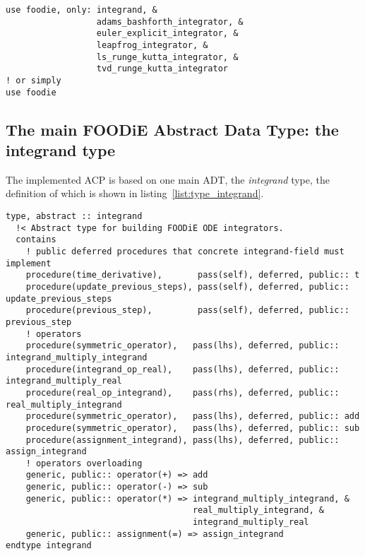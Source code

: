 \documentclass[pdftex,preprint,3p,times,numbers]{elsarticle}
\begin{document}
\begin{lstlisting}[firstnumber=1,style=code,caption={usage example importing all public entities of FOODiE main module},label={list:main_module}]
use foodie, only: integrand, &
                  adams_bashforth_integrator, &
                  euler_explicit_integrator, &
                  leapfrog_integrator, &
                  ls_runge_kutta_integrator, &
                  tvd_runge_kutta_integrator
! or simply
use foodie
\end{lstlisting}

\subsection{The main FOODiE Abstract Data Type: the integrand type}\label{subsec:type_integrand}

The implemented ACP is based on one main ADT, the \emph{integrand} type, the definition of which is shown in listing~\ref{list:type_integrand}.

\begin{lstlisting}[firstnumber=1,style=code,caption={integrand type definition},label={list:type_integrand}]
type, abstract :: integrand
  !< Abstract type for building FOODiE ODE integrators.
  contains
    ! public deferred procedures that concrete integrand-field must implement
    procedure(time_derivative),       pass(self), deferred, public:: t
    procedure(update_previous_steps), pass(self), deferred, public:: update_previous_steps
    procedure(previous_step),         pass(self), deferred, public:: previous_step
    ! operators
    procedure(symmetric_operator),   pass(lhs), deferred, public:: integrand_multiply_integrand
    procedure(integrand_op_real),    pass(lhs), deferred, public:: integrand_multiply_real
    procedure(real_op_integrand),    pass(rhs), deferred, public:: real_multiply_integrand
    procedure(symmetric_operator),   pass(lhs), deferred, public:: add
    procedure(symmetric_operator),   pass(lhs), deferred, public:: sub
    procedure(assignment_integrand), pass(lhs), deferred, public:: assign_integrand
    ! operators overloading
    generic, public:: operator(+) => add
    generic, public:: operator(-) => sub
    generic, public:: operator(*) => integrand_multiply_integrand, &
                                     real_multiply_integrand, &
                                     integrand_multiply_real
    generic, public:: assignment(=) => assign_integrand
endtype integrand
\end{lstlisting}
\end{document}
